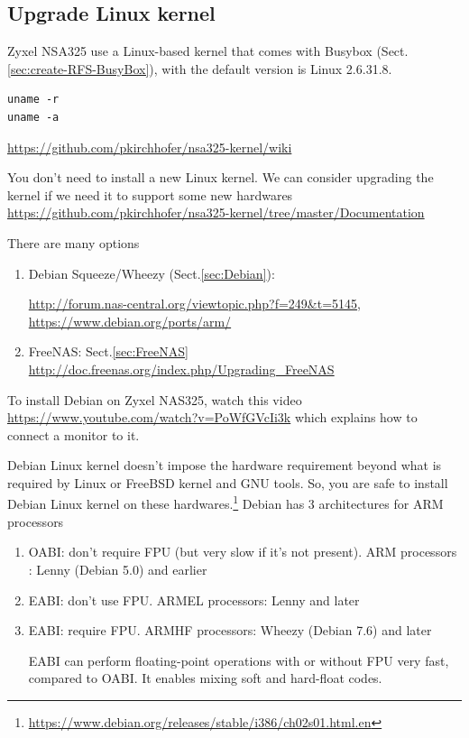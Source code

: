 \subsection{Upgrade Linux kernel}
\label{sec:zyxel_linux-kernel}

Zyxel NSA325 use a Linux-based kernel that comes with Busybox
(Sect.\ref{sec:create-RFS-BusyBox}), with the default version is Linux 2.6.31.8.
\begin{verbatim}
uname -r
uname -a
\end{verbatim}
\url{https://github.com/pkirchhofer/nsa325-kernel/wiki}

You don't need to install a new Linux kernel. 
We can consider upgrading the kernel if we need it to support some new hardwares 
\url{https://github.com/pkirchhofer/nsa325-kernel/tree/master/Documentation}

There are many options
\begin{enumerate}
  \item Debian Squeeze/Wheezy (Sect.\ref{sec:Debian}):

  \url{http://forum.nas-central.org/viewtopic.php?f=249&t=5145},
  \url{https://www.debian.org/ports/arm/}

  \item FreeNAS: Sect.\ref{sec:FreeNAS} \url{http://doc.freenas.org/index.php/Upgrading_FreeNAS}
\end{enumerate}

To install Debian on Zyxel NAS325, watch this video
\url{https://www.youtube.com/watch?v=PoWfGVcIi3k} which explains how to connect
a monitor to it.

Debian Linux kernel doesn't impose the hardware requirement beyond what is
required by Linux or FreeBSD kernel and GNU tools. So, you are safe to install
Debian Linux kernel on these
hardwares.\footnote{\url{https://www.debian.org/releases/stable/i386/ch02s01.html.en}}
Debian has 3 architectures for ARM processors 
\begin{enumerate}
  \item OABI: don't require FPU (but very slow if it's not present). ARM
  processors :   Lenny (Debian 5.0) and earlier
  
  \item EABI: don't use FPU. ARMEL processors: Lenny and later
  
  \item EABI: require FPU. ARMHF processors: Wheezy (Debian 7.6) and later
  
EABI can perform floating-point operations with or without FPU very fast,
compared to OABI. It enables mixing soft and hard-float codes.
\end{enumerate}

